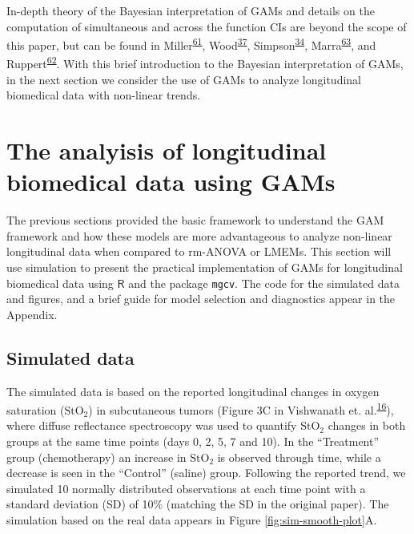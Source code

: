 \documentclass[
]{article}
\newcommand{\passthrough}[1]{#1}
\begin{document}
In-depth theory of the Bayesian interpretation of GAMs and details on the computation of simultaneous and across the function CIs are beyond the scope of this paper, but can be found in Miller\textsuperscript{\protect\hyperlink{ref-miller2019}{61}}, Wood\textsuperscript{\protect\hyperlink{ref-wood2017}{37}}, Simpson\textsuperscript{\protect\hyperlink{ref-simpson2018}{34}}, Marra\textsuperscript{\protect\hyperlink{ref-marra2012}{63}}, and Ruppert\textsuperscript{\protect\hyperlink{ref-ruppert2003}{62}}. With this brief introduction to the Bayesian interpretation of GAMs, in the next section we consider the use of GAMs to analyze longitudinal biomedical data with non-linear trends.

\hypertarget{longitudinal-GAMs}{%
\section{The analyisis of longitudinal biomedical data using GAMs}\label{longitudinal-GAMs}}

The previous sections provided the basic framework to understand the GAM framework and how these models are more advantageous to analyze non-linear longitudinal data when compared to rm-ANOVA or LMEMs. This section will use simulation to present the practical implementation of GAMs for longitudinal biomedical data using \(\textsf{R}\) and the package \passthrough{\lstinline!mgcv!}. The code for the simulated data and figures, and a brief guide for model selection and diagnostics appear in the Appendix.

\hypertarget{simulated-data}{%
\subsection{Simulated data}\label{simulated-data}}

The simulated data is based on the reported longitudinal changes in oxygen saturation (\(\mbox{StO}_2\)) in subcutaneous tumors (Figure 3C in Vishwanath et. al.\textsuperscript{\protect\hyperlink{ref-vishwanath2009}{16}}), where diffuse reflectance spectroscopy was used to quantify \(\mbox{StO}_2\) changes in both groups at the same time points (days 0, 2, 5, 7 and 10). In the ``Treatment'' group (chemotherapy) an increase in \(\mbox{StO}_2\) is observed through time, while a decrease is seen in the ``Control'' (saline) group. Following the reported trend, we simulated 10 normally distributed observations at each time point with a standard deviation (SD) of 10\% (matching the SD in the original paper).
The simulation based on the real data appears in Figure \ref{fig:sim-smooth-plot}A.
\end{document}
